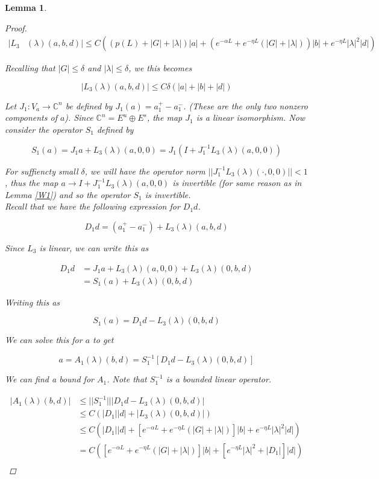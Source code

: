 \documentclass[12pt]{article}
\def\C{{\mathbb C}}
\newtheorem{lemma}{Lemma}
\begin{document}
\begin{lemma}
\begin{proof}
\begin{align*}
|L_3&(\lambda)(a,b,d)| \leq C \left( \left( p(L) + |G| + |\lambda|\right) |a| + \left( e^{-\alpha L} + e^{-\eta L} \left(|G| + |\lambda|\right) \right) |b| + e^{-\eta L} |\lambda|^2 |d| \right)
\end{align*}


Recalling that $|G|\leq \delta$ and $|\lambda| \leq \delta$, we this becomes 

\[
|L_3(\lambda)(a,b,d)| \leq C\delta(|a| + |b| + |d|)
\]

Let $J_1: V_a \rightarrow \C^n$ be defined by $J_1(a) = a_1^+ - a_1^-$. (These are the only two nonzero components of $a$). Since $\C^n = E^u \oplus E^s$, the map $J_1$ is a linear isomorphism. Now consider the operator $S_1$ defined by

\[
S_1(a) = J_1 a + L_3(\lambda)(a, 0, 0) = J_1( I + J_1^{-1} L_3(\lambda)(a, 0, 0) )
\]

For suffiencty small $\delta$, we will have the operator norm $||J_1^{-1} L_3(\lambda)(\cdot, 0, 0)|| < 1$, thus the map $a \rightarrow I + J_1^{-1} L_3(\lambda)(a, 0, 0)$ is invertible (for same reason as in Lemma \ref{W1}) and so the operator $S_1$ is invertible.\\

Recall that we have the following expression for $D_1 d$.

\[
D_1 d = (a^+_1 - a^-_1) + L_3(\lambda)(a,b,d)
\] 

Since $L_3$ is linear, we can write this as

\begin{align*}
D_1 d &= J_1 a + L_3(\lambda)(a, 0, 0) + L_3(\lambda)(0, b, d) \\
&= S_1(a) + L_3(\lambda)(0, b, d) 
\end{align*}

Writing this as 

\[
S_1(a) = D_1 d - L_3(\lambda)(0, b, d) 
\]

We can solve this for $a$ to get

\begin{equation}
a = A_1(\lambda)(b,d) = S_1^{-1}[D_1 d - L_3(\lambda)(0, b, d)] 
\end{equation}

We can find a bound for $A_1$. Note that $S_1^{-1}$ is a bounded linear operator.

\begin{align*}
|A_1(\lambda)(b,d)| &\leq ||S_1^{-1}|||D_1 d - L_3(\lambda)(0, b, d)| \\
&\leq C (|D_1||d| + |L_3(\lambda)(0, b, d)|) \\
&\leq C (|D_1||d| +  \left[e^{-\alpha L} + e^{-\eta L} \left(|G| + |\lambda| \right) \right]|b| + e^{-\eta L} |\lambda|^2 |d|)\\
&= C\left( \left[e^{-\alpha L} + e^{-\eta L} \left(|G| + |\lambda|\right) \right]|b| + \left[ e^{-\eta L} |\lambda|^2 + |D_1| \right] |d| \right)\\
\end{align*}


\end{proof}
\end{lemma}
\end{document}
